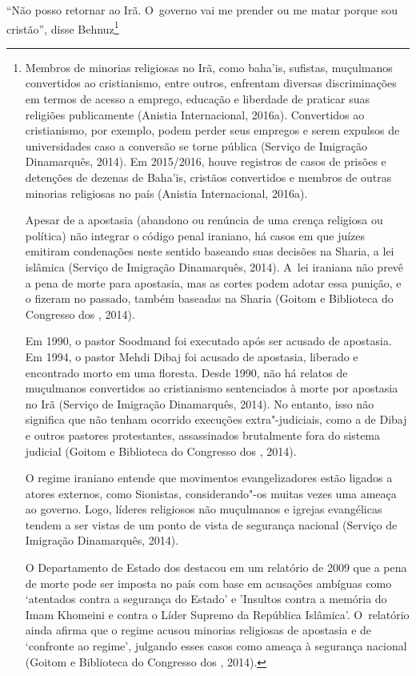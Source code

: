 ``Não posso retornar ao Irã. O~governo vai me prender ou me matar porque
sou cristão'', disse Behnuz\footnote{Membros de minorias religiosas no Irã, como baha'is,
sufistas, muçulmanos convertidos ao cristianismo, entre outros,
enfrentam diversas discriminações em termos de acesso a emprego,
educação e liberdade de praticar suas religiões publicamente (Anistia
Internacional, 2016a). Convertidos ao cristianismo, por exemplo, podem
perder seus empregos e serem expulsos de universidades caso a conversão
se torne pública (Serviço de Imigração Dinamarquês, 2014). Em 2015/2016,
houve registros de casos de prisões e detenções de dezenas de Baha'is,
cristãos convertidos e membros de outras minorias religiosas no país
(Anistia Internacional, 2016a).

Apesar de a apostasia (abandono ou renúncia de uma crença religiosa ou
política) não integrar o código penal iraniano, há casos em que juízes
emitiram condenações neste sentido baseando suas decisões na Sharia, a
lei islâmica (Serviço de Imigração Dinamarquês, 2014). A~lei iraniana
não prevê a pena de morte para apostasia, mas as cortes podem adotar
essa punição, e o fizeram no passado, também baseadas na Sharia (Goitom
e Biblioteca do Congresso dos , 2014).

Em 1990, o pastor Soodmand foi executado após ser acusado de apostasia.
Em 1994, o pastor Mehdi Dibaj foi acusado de apostasia, liberado e
encontrado morto em uma floresta. Desde 1990, não há relatos de
muçulmanos convertidos ao cristianismo sentenciados à morte por
apostasia no Irã (Serviço de Imigração Dinamarquês, 2014). No entanto,
isso não significa que não tenham ocorrido execuções extra"-judiciais,
como a de Dibaj e outros pastores protestantes, assassinados brutalmente
fora do sistema judicial (Goitom e Biblioteca do Congresso dos ,
2014).

O regime iraniano entende que movimentos evangelizadores estão ligados a
atores externos, como Sionistas, considerando"-os muitas vezes uma ameaça
ao governo. Logo, líderes religiosos não muçulmanos e igrejas
evangélicas tendem a ser vistas de um ponto de vista de segurança
nacional (Serviço de Imigração Dinamarquês, 2014).

O Departamento de Estado dos  destacou em um relatório de 2009 que a
pena de morte pode ser imposta no país com base em acusações ambíguas
como `atentados contra a segurança do Estado' e 'Insultos contra a
memória do Imam Khomeini e contra o Líder Supremo da República
Islâmica'. O~relatório ainda afirma que o regime acusou minorias
religiosas de apostasia e de `confronte ao regime', julgando esses casos
como ameaça à segurança nacional (Goitom e Biblioteca do Congresso dos
, 2014).

}
